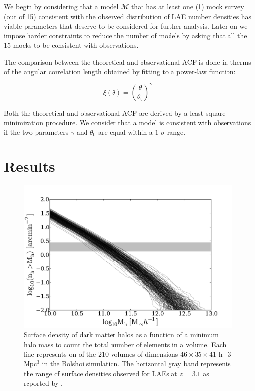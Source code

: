 \documentclass[usenatbib]{mn2e}
\begin{document}
We begin by considering that  a model ${\mathcal M}$ that has at least
one (1) mock survey (out of 15) consistent with the observed
distribution of LAE number densities has viable parameters that
deserve to be considered for further analysis. Later on we impose
harder constraints to reduce the number of models by asking that all
the 15 mocks to be consistent with observations.


The comparison between the theoretical and observational ACF is done
in therms of the angular correlation length obtained  by fitting to a power-law
function:  

\begin{equation}
\xi(\theta) = \left(\frac{\theta}{\theta_{0}}\right)^{\gamma}
\label{eq:fitting}
\end{equation}

Both the theoretical and observational ACF are derived by a least
square minimization procedure. We consider that a model is consistent
with observations if the two parameters $\gamma$ and $\theta_0$ are
equal within a $1$-$\sigma$ range.



 
\section{Results}
\label{sec:results}

\begin{figure}
\begin{center}
\includegraphics[width=1.10\linewidth,angle=0]{./plots/Fig1.pdf}
\caption{ \label{fig:halos} Surface density of dark
  matter halos as a function of a minimum halo mass to count the
  total number of elements in a volume. Each line represents on of the
  $210$ volumes of dimensions $46\times 35\times 41$ h${-3}$Mpc$^{3}$
  in the Bolshoi simulation. The horizontal gray band represents the
  range of surface densities observed for LAEs at $z=3.1$ as reported
  by \citep{Yamada2012}.}
\end{center} 
\end{figure}
\end{document}
